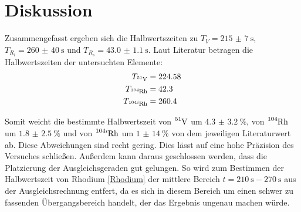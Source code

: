 \section{Diskussion}
\label{sec:Diskussion}

Zusammengefasst ergeben sich die Halbwertszeiten zu $T_V=\SI{215(7)}{\s}$, $T_{R_l}=\SI{260(40)}{\s}$ und $T_{R_s}=\SI{43.0(11)}{\s}$. Laut Literatur \cite{JLab} betragen die Halbwertszeiten der untersuchten Elemente:
\begin{align*}
    T_{\ce{^{51}V}}&=224.58  \\
    T_{\ce{^{104}Rh}}&=42.3  \\
    T_{\ce{^{104i}Rh}}&=260.4
\end{align*}

Somit weicht die bestimmte Halbwertszeit von $\ce{^{51}V}$ um $\SI{4.3(32)}{\percent}$, von $\ce{^{104}Rh}$ um $\SI{1.8(25)}{\percent}$ und von $\ce{^{104i}Rh}$ um $\SI{1(14)}{\percent}$ von dem jeweiligen Literaturwert ab. Diese Abweichungen sind recht gering. Dies lässt auf eine hohe Präzision des Versuches schließen. Außerdem kann daraus geschlossen werden, dass die Platzierung der Ausgleichsgeraden gut gelungen. So wird zum Bestimmen der Halbwertszeit von Rhodium \ref{Rhodium} der mittlere Bereich $t=\SI{210}{\s}-\SI{270}{\s}$ aus der Ausgleichsrechnung entfert, da es sich in diesem Bereich um einen schwer zu fassenden Übergangsbereich handelt, der das Ergebnis ungenau machen würde.



